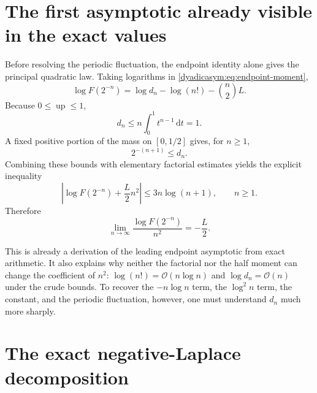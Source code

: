 \documentclass[11pt,oneside]{article}
\theoremstyle{definition}
\theoremstyle{remark}
\newcommand{\Up}{\operatorname{up}}
\newcommand{\dd}{\,\mathrm d}
\newcommand{\bigO}{\mathcal O}
\begin{document}
\section{The first asymptotic already visible in the exact values}
\label{dyadicasym:sec:coarse}

Before resolving the periodic fluctuation, the endpoint identity alone gives the principal
quadratic law.  Taking logarithms in \eqref{dyadicasym:eq:endpoint-moment},
\begin{equation}
 \log F(2^{-n})=\log d_n-\log(n!)-\binom n2L.               \label{dyadicasym:eq:log-F-exact}
\end{equation}
Because $0\le\Up\le1$,
\begin{equation}
 d_n\le n\int_0^1t^{n-1}\dd t=1.                           \label{dyadicasym:eq:dn-upper}
\end{equation}
A fixed positive portion of the mass on $[0,1/2]$ gives, for $n\ge1$,
\begin{equation}
 2^{-(n+1)}\le d_n.                                         \label{dyadicasym:eq:dn-lower}
\end{equation}
Combining these bounds with elementary factorial estimates yields the explicit inequality
\begin{equation}
 \left|\log F(2^{-n})+\frac L2n^2\right|
 \le3n\log(n+1),\qquad n\ge1.                              \label{dyadicasym:eq:coarse-bound}
\end{equation}
Therefore
\begin{equation}
 \lim_{n\to\infty}\frac{\log F(2^{-n})}{n^2}=-\frac L2.    \label{dyadicasym:eq:coarse-limit}
\end{equation}

This is already a derivation of the leading endpoint asymptotic from exact arithmetic.  It
also explains why neither the factorial nor the half moment can change the coefficient of
$n^2$: $\log(n!)=\bigO(n\log n)$ and $\log d_n=\bigO(n)$ under the crude bounds.  To recover
the $-n\log n$ term, the $\log^2n$ term, the constant, and the periodic fluctuation, however,
one must understand $d_n$ much more sharply.

\section{The exact negative-Laplace decomposition}
\label{dyadicasym:sec:laplace-product}
\end{document}
